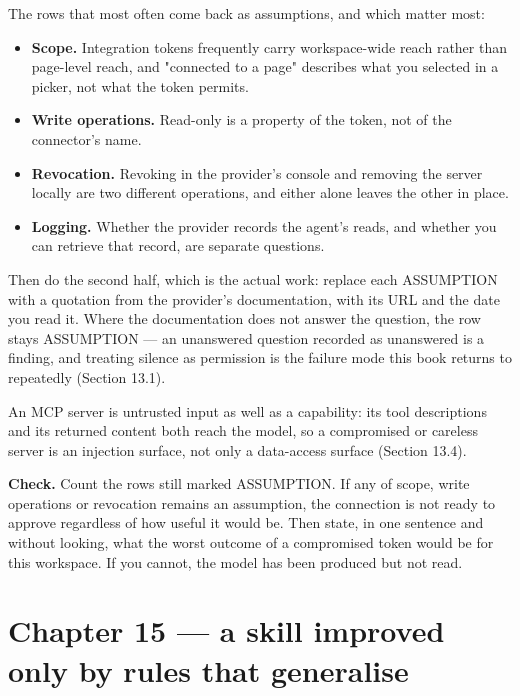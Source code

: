 \documentclass[11pt,a4paper,twoside,openany]{book}
\begin{document}
The rows that most often come back as assumptions, and which matter most:


\begin{itemize}
\item \textbf{Scope.} Integration tokens frequently carry workspace-wide reach rather than page-level reach, and "connected to a page" describes what you selected in a picker, not what the token permits.
\item \textbf{Write operations.} Read-only is a property of the token, not of the connector's name.
\item \textbf{Revocation.} Revoking in the provider's console and removing the server locally are two different operations, and either alone leaves the other in place.
\item \textbf{Logging.} Whether the provider records the agent's reads, and whether you can retrieve that record, are separate questions.
\end{itemize}

Then do the second half, which is the actual work: replace each ASSUMPTION with a quotation from the provider's documentation, with its URL and the date you read it. Where the documentation does not answer the question, the row stays ASSUMPTION — an unanswered question recorded as unanswered is a finding, and treating silence as permission is the failure mode this book returns to repeatedly (Section 13.1).


An MCP server is untrusted input as well as a capability: its tool descriptions and its returned content both reach the model, so a compromised or careless server is an injection surface, not only a data-access surface (Section 13.4).


\textbf{Check.} Count the rows still marked ASSUMPTION. If any of scope, write operations or revocation remains an assumption, the connection is not ready to approve regardless of how useful it would be. Then state, in one sentence and without looking, what the worst outcome of a compromised token would be for this workspace. If you cannot, the model has been produced but not read.


\FloatBarrier
\section*{Chapter 15 — a skill improved only by rules that generalise}
\end{document}
